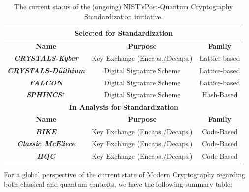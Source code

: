 \documentclass[runningheads]{llncs}
\numberwithin{equation}{section}
\begin{document}
    \vspace{-3ex}
    \begin{table}[ht!]
        \centering
        \begin{tabular}{|ccc|}
            \hline
            \multicolumn{3}{|c|}{\textbf{Selected for Standardization}} \\ \hline \hline
            \multicolumn{1}{|c|}{\textbf{Name}} & \multicolumn{1}{c|}{\textbf{Purpose}} & \textbf{Family} \\ \hline \hline
            \multicolumn{1}{|c|}{\textbf{\textit{CRYSTALS-Kyber}}} & \multicolumn{1}{c|}{Key Exchange (Encaps./Decaps.)} & Lattice-based \\ \hline
            \multicolumn{1}{|c|}{\textbf{\textit{CRYSTALS-Dilithium}}} & \multicolumn{1}{c|}{Digital Signature Scheme} & Lattice-based \\ \hline
            \multicolumn{1}{|c|}{\textbf{\textit{FALCON}}} & \multicolumn{1}{c|}{Digital Signature Scheme} & Lattice-based \\ \hline
            \multicolumn{1}{|c|}{\textbf{\textit{SPHINCS${}^{+}$}}} & \multicolumn{1}{c|}{Digital Signature Scheme} & Hash-Based \\ \hline \hline
            \multicolumn{3}{|c|}{\textbf{In Analysis for Standardization}} \\ \hline \hline
            \multicolumn{1}{|c|}{\textbf{Name}} & \multicolumn{1}{c|}{\textbf{Purpose}} & \textbf{Family} \\ \hline \hline
            \multicolumn{1}{|c|}{\textbf{\textit{BIKE}}} & \multicolumn{1}{c|}{Key Exchange (Encaps./Decaps.)} & Code-Based \\ \hline
            \multicolumn{1}{|c|}{\textbf{\textit{Classic McEliece}}} & \multicolumn{1}{c|}{Key Exchange (Encaps./Decaps.)} & Code-Based \\ \hline
            \multicolumn{1}{|c|}{\textbf{\textit{HQC}}} & \multicolumn{1}{c|}{Key Exchange (Encaps./Decaps.)} & Code-Based \\ \hline
        \end{tabular}
        \caption{\centering The current status of the (ongoing) NIST's\break Post-Quantum Cryptography Standardization initiative.}
        \label{tab:current-status-post-quantum-cryptography-standardization-initiative}
    \end{table}

    \vspace{-2ex}
    
    \noindent For a global perspective of the current state of Modern Cryptography regarding both classical and quantum contexts, we have the following summary table:
\end{document}
